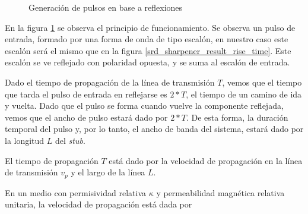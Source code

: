 \begin{figure}[h!]
    \centering
    \caption{Generación de pulsos en base a reflexiones}
    \label{fig:stub_time_domain_waveforms}
\end{figure}

En la figura \ref{fig:stub_time_domain_waveforms} se observa el principio de
funcionamiento. Se observa un pulso de entrada, formado por una forma de onda de
tipo escalón, en nuestro caso este escalón será el mismo que en la figura
\ref{srd_sharpener_result_rise_time}. Este escalón se ve reflejado con polaridad
opuesta, y se suma al escalón de entrada.

Dado el tiempo de propagación de la línea de transmisión $T$, vemos que el
tiempo que tarda el pulso de entrada en reflejarse es $2*T$, el tiempo de un
camino de ida y vuelta. Dado que el pulso se forma cuando vuelve la componente
reflejada, vemos que el ancho de pulso estará dado por $2*T$. De esta forma, la
duración temporal del pulso y, por lo tanto, el ancho de banda del sistema,
estará dado por la longitud $L$ del \textit{stub}.

El tiempo de propagación $T$ está dado por la velocidad de propagación en la
línea de transmisión $v_p$ y el largo de la línea $L$.

En un medio con permisividad relativa $\kappa$ y permeabilidad magnética
relativa unitaria, la velocidad de propagación está dada por \cite{pozar2011}

